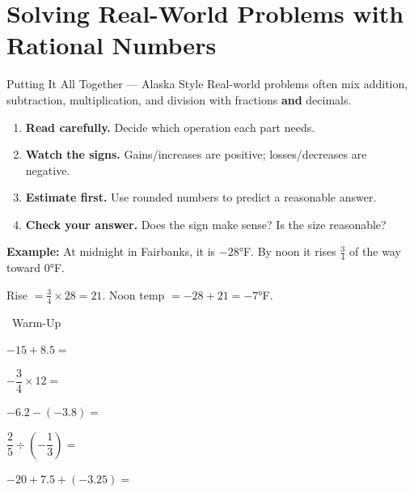 \section{Solving Real-World Problems with Rational Numbers}

\begin{quickReview}{Putting It All Together --- Alaska Style}
Real-world problems often mix addition, subtraction, multiplication, and division with fractions \textbf{and} decimals.

\begin{enumerate}[leftmargin=*]
    \item \textbf{Read carefully.} Decide which operation each part needs.
    \item \textbf{Watch the signs.} Gains/increases are positive; losses/decreases are negative.
    \item \textbf{Estimate first.} Use rounded numbers to predict a reasonable answer.
    \item \textbf{Check your answer.} Does the sign make sense? Is the size reasonable?
\end{enumerate}

\medskip
\textbf{Example:} At midnight in Fairbanks, it is $-28°$F. By noon it rises $\frac{3}{4}$ of the way toward $0°$F.

Rise $= \frac{3}{4} \times 28 = 21$. Noon temp $= -28 + 21 = -7°$F.
\end{quickReview}

\begin{practiceBox}[funGreen]{\faSun~Warm-Up}


\prob $-15 + 8.5 =$ \answerBlank[2cm]

\prob $-\dfrac{3}{4} \times 12 =$ \answerBlank[2cm]

\prob $-6.2 - (-3.8) =$ \answerBlank[2cm]

\prob $\dfrac{2}{5} \div \left(-\dfrac{1}{3}\right) =$ \answerBlank[2cm]

\prob $-20 + 7.5 + (-3.25) =$ \answerBlank[2cm]

\end{practiceBox}

